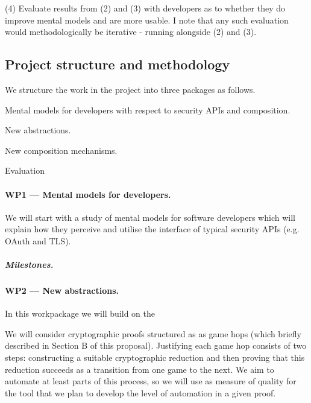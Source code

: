 \documentclass[10pt]{article}
\begin{document}
 (4) Evaluate results from (2) and (3) with developers as to whether they do improve mental models and are more usable. I note that any such evaluation would methodologically be iterative - running alongside (2) and (3).





\subsection{Project structure and methodology}
We structure the work in the project into three packages as follows.

\begin{description}\itemsep-3pt
\item[WP 1] Mental models for developers with respect to security APIs and composition. 
\item[WP 2] New abstractions.
\item[WP 3] New composition mechanisms.
\item[WP 4] Evaluation
\end{description}

\paragraph{WP1 --- Mental models for developers.}
%
We will start with a study of mental models for software developers which will explain how they perceive and utilise the interface of typical security APIs (e.g. OAuth and TLS). 

\vspace{-\baselineskip}
\subparagraph{Milestones.} 

\paragraph{WP2 --- New abstractions.}
%
In this workpackage we will build on the 

%
We will consider cryptographic proofs structured as as game hops (which briefly described in Section B of this proposal).  
Justifying each game hop consists of two steps: constructing a suitable cryptographic reduction and then proving that this reduction succeeds as a transition from one game to the next.  
We aim to automate at least parts of this process, so we will use as measure of quality for the tool that we plan to develop the level of automation in a given proof. 
\end{document}
